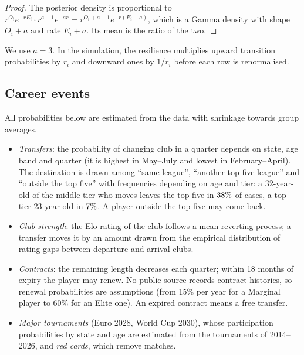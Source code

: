 \documentclass[11pt]{amsart}
\theoremstyle{definition}
\theoremstyle{remark}
\begin{document}
\begin{proof}
The posterior density is proportional to $r^{O_i}e^{-rE_i}\cdot r^{a-1}e^{-ar}=r^{O_i+a-1}e^{-r(E_i+a)}$, which is a Gamma density with shape $O_i+a$ and rate $E_i+a$. Its mean is the ratio of the two.
\end{proof}

We use $a=3$. In the simulation, the resilience multiplies upward transition probabilities by $r_i$ and downward ones by $1/r_i$ before each row is renormalised.

\subsection{Career events}
All probabilities below are estimated from the data with shrinkage towards group averages.
\begin{itemize}
\item \emph{Transfers}: the probability of changing club in a quarter depends on state, age band and quarter (it is highest in May--July and lowest in February--April). The destination is drawn among ``same league'', ``another top-five league'' and ``outside the top five'' with frequencies depending on age and tier: a 32-year-old of the middle tier who moves leaves the top five in $38\%$ of cases, a top-tier 23-year-old in $7\%$. A player outside the top five may come back.
\item \emph{Club strength}: the Elo rating of the club follows a mean-reverting process; a transfer moves it by an amount drawn from the empirical distribution of rating gaps between departure and arrival clubs.
\item \emph{Contracts}: the remaining length decreases each quarter; within 18 months of expiry the player may renew. No public source records contract histories, so renewal probabilities are assumptions (from 15\% per year for a Marginal player to 60\% for an Elite one). An expired contract means a free transfer.
\item \emph{Major tournaments} (Euro 2028, World Cup 2030), whose participation probabilities by state and age are estimated from the tournaments of 2014--2026, and \emph{red cards}, which remove matches.
\end{itemize}
\end{document}
